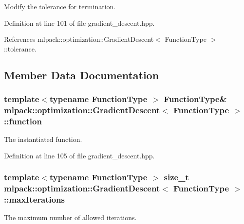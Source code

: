 Modify the tolerance for termination. 



Definition at line 101 of file gradient\+\_\+descent.\+hpp.



References mlpack\+::optimization\+::\+Gradient\+Descent$<$ Function\+Type $>$\+::tolerance.



\subsection{Member Data Documentation}
\subsubsection[{function}]{\setlength{\rightskip}{0pt plus 5cm}template$<$typename Function\+Type $>$ Function\+Type\& {\bf mlpack\+::optimization\+::\+Gradient\+Descent}$<$ Function\+Type $>$\+::function\hspace{0.3cm}{\ttfamily [private]}}\label{classmlpack_1_1optimization_1_1GradientDescent_a86773ecb5168d7cb08e36cda3d336b55}


The instantiated function. 



Definition at line 105 of file gradient\+\_\+descent.\+hpp.

\subsubsection[{max\+Iterations}]{\setlength{\rightskip}{0pt plus 5cm}template$<$typename Function\+Type $>$ size\+\_\+t {\bf mlpack\+::optimization\+::\+Gradient\+Descent}$<$ Function\+Type $>$\+::max\+Iterations\hspace{0.3cm}{\ttfamily [private]}}\label{classmlpack_1_1optimization_1_1GradientDescent_a7bf45f14dbde579be1c4ecb934d2984f}


The maximum number of allowed iterations. 



